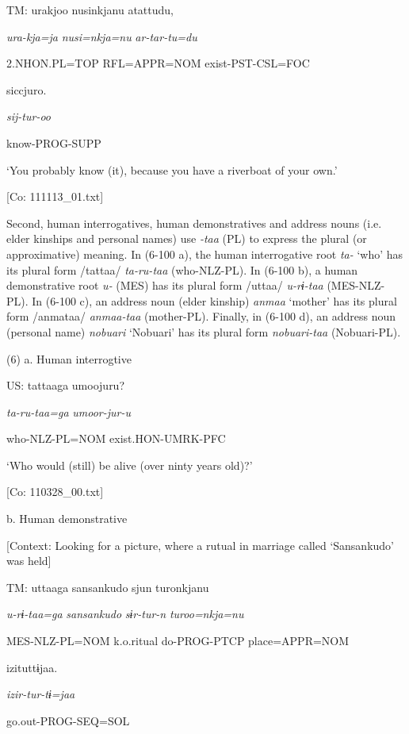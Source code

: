     TM:  urakjoo  nusinkjanu  atattudu,

      \textit{ura-kja=ja}  \textit{nusi=nkja=nu}  \textit{ar-tar-tu=du}

      2.NHON.PL=TOP  RFL=APPR=NOM  exist-PST-CSL=FOC

      siccjuro.

      \textit{sij-tur-oo}

      know-PROG-SUPP

      ‘You probably know (it), because you have a riverboat of your own.’

      [Co: 111113\_01.txt]

  Second, human interrogatives, human demonstratives and address nouns (i.e. elder kinships and personal names) use \textit{{}-taa} (PL) to express the plural (or approximative) meaning. In (6-100 a), the human interrogative root \textit{ta-} ‘who’ has its plural form /tattaa/ \textit{ta-ru-taa} (who-NLZ-PL). In (6-100 b), a human demonstrative root \textit{u-} (MES) has its plural form /uttaa/ \textit{u-rɨ-taa} (MES-NLZ-PL). In (6-100 c), an address noun (elder kinship) \textit{anmaa} ‘mother’ has its plural form /anmataa/ \textit{anmaa-taa} (mother-PL). Finally, in (6-100 d), an address noun (personal name) \textit{nobuari} ‘Nobuari’ has its plural form \textit{nobuari-taa} (Nobuari-PL).

(6)  a.  Human interrogtive

    US:  tattaaga  umoojuru?

      \textit{ta-ru-taa=ga}  \textit{umoor-jur-u}

      who-NLZ-PL=NOM  exist.HON-UMRK-PFC

      ‘Who would (still) be alive (over ninty years old)?’

      [Co: 110328\_00.txt]

  b.  Human demonstrative

    [Context: Looking for a picture, where a rutual in marriage called ‘Sansankudo’ was held]

    TM:  uttaaga  {\textbar}sansankudo{\textbar}  sjun  turonkjanu

      \textit{u-rɨ-taa=ga}  \textit{sansankudo}  \textit{sɨr-tur-n}  \textit{turoo=nkja=nu}

      MES-NLZ-PL=NOM  k.o.ritual  do-PROG-PTCP  place=APPR=NOM

      izituttɨjaa.

      \textit{izir-tur-tɨ=jaa}

      go.out-PROG-SEQ=SOL

